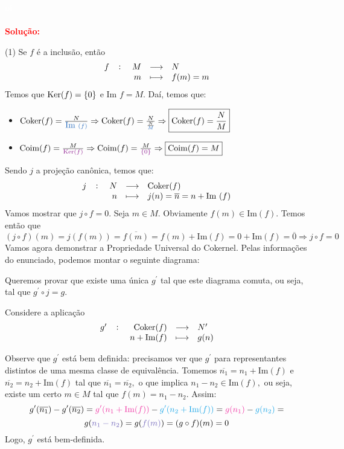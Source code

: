\documentclass[11pt,a4paper]{article}
\newcommand{\dividiritens}[1]{\begin{tasks}[counter-format={(tsk[a])},label-width=3.6ex, label-format = {\bfseries}, column-sep = {0pt}](1) #1 \end{tasks}}
\newcommand{\pers}[1]{\textcolor{Floresta}{$\negrito{(#1)} $}}
\newcommand{\solucao}[1]{
\textbf{\textcolor{white}{oi}\\ \\ \textcolor{red}{Solução:}} #1}
\begin{document}
\solucao{
\dividiritens{
\task[\pers{a}]  Se $f$ é a inclusão, então
\[
\fullfunction{f}{M}{N}{m}{f(m) = m}
\]
Temos que ${\rm Ker} (f) = \{ 0 \} $ e $\mbox{Im } f = M.$ Daí, temos que:
\begin{itemize}
    \item $\Coker(f) = \frac{N}{\textcolor{NavyBlue}{\mbox{Im }(f)}} \Rightarrow \Coker(f) = \frac{N}{ \frac{N}{\textcolor{NavyBlue}{M}}} \Rightarrow \boxed{\Coker(f) = \frac{N}{M}}$

    \item $\Coim(f) = \frac{M}{\textcolor{Plum}{\Ker (f)}} \Rightarrow \Coim(f) = \frac{M}{\textcolor{Plum}{\{ 0 \}}} \Rightarrow \boxed{\Coim(f) = M}$
\end{itemize}
\task[\pers{b}] Sendo $j$ a projeção canônica, temos que:
\[
\fullfunction{j}{N}{\Coker(f)}{n}{j(n) = \overline{n} = n + \mbox{Im }(f)}
\]
Vamos mostrar que $j \circ f = 0.$ Seja $m \in M.$ Obviamente $f(m) \in \mbox{Im}(f).$ Temos então que
\[
(j \circ f)(m) = j(f(m)) = \overline{f(m)} = f(m) + \mbox{Im}(f) = 0 + \mbox{Im}(f) = \overline{0} \Rightarrow \boxed{j \circ f = 0}
\]
Vamos agora demonstrar a Propriedade Universal do Cokernel. Pelas informações do enunciado, podemos montar o seguinte diagrama:  }}
\begin{center}
\end{center}
Queremos provar que existe uma única $g^{\prime}$ tal que este diagrama comuta, ou seja, tal que $g^{\prime} \circ j = g.$

Considere a aplicação
\[
\fullfunction{g^{\prime}}{\Coker(f)}{N^{\prime}}{n + \mbox{Im}(f)}{g(n)}
\]

Observe que $g^{\prime}$ está bem definida: precisamos ver que $g^{\prime}$ para representantes distintos de uma mesma classe de equivalência. Tomemos $\overline{n_1} = n_1 + \mbox{Im}(f)$ e $\overline{n_2} = n_2 + \mbox{Im}(f)$ tal que $\overline{n_1} = \overline{n_2},$ o que implica $n_1 - n_2 \in \mbox{Im}(f),$ ou seja, existe um certo $m \in M$ tal que $f(m) = n_1 - n_2.$ Assim:
\[
g^{\prime}(\overline{n_1}) - g^{\prime}(\overline{n_2}) = \textcolor{Rhodamine}{g^{\prime}(n_1 + \mbox{Im}(f))} - \textcolor{Cerulean}{g^{\prime}(n_2 + \mbox{Im}(f))} = \textcolor{Rhodamine}{g(n_1)} - \textcolor{Cerulean}{g(n_2)} = \]\[ g(\textcolor{Periwinkle}{n_1 - n_2}) = g(\textcolor{Periwinkle}{f(m)}) = (g \circ f)(m) = 0
\]
Logo, $g^{\prime}$ está bem-definida.
\end{document}
